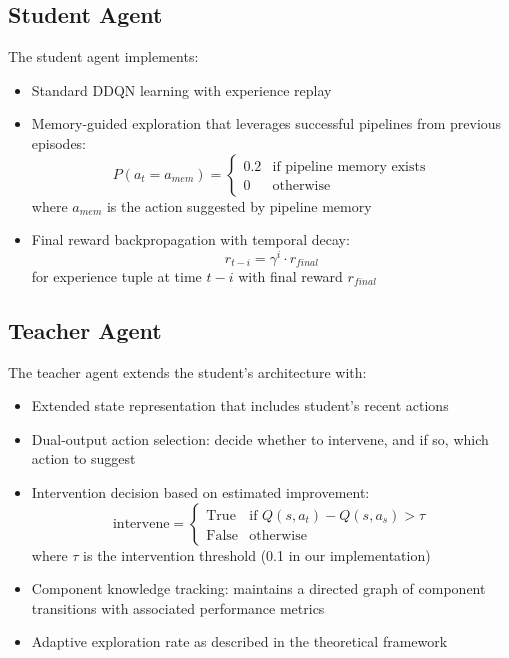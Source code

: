 \documentclass[twoside,11pt]{article}
\begin{document}
\subsection{Student Agent}

The student agent implements:

\begin{itemize}
    \item Standard DDQN learning with experience replay
    \item Memory-guided exploration that leverages successful pipelines from previous episodes:
    \begin{equation}
    P(a_t = a_{mem}) = 
    \begin{cases}
    0.2 & \text{if pipeline memory exists} \\
    0 & \text{otherwise}
    \end{cases}
    \end{equation}
    where $a_{mem}$ is the action suggested by pipeline memory
    
    \item Final reward backpropagation with temporal decay:
    \begin{equation}
    r_{t-i} = \gamma^i \cdot r_{final}
    \end{equation}
    for experience tuple at time $t-i$ with final reward $r_{final}$
\end{itemize}

\subsection{Teacher Agent}

The teacher agent extends the student's architecture with:

\begin{itemize}
    \item Extended state representation that includes student's recent actions
    \item Dual-output action selection: decide whether to intervene, and if so, which action to suggest
    \item Intervention decision based on estimated improvement:
    \begin{equation}
    \text{intervene} = 
    \begin{cases}
    \text{True} & \text{if } Q(s, a_t) - Q(s, a_s) > \tau \\
    \text{False} & \text{otherwise}
    \end{cases}
    \end{equation}
    where $\tau$ is the intervention threshold (0.1 in our implementation)
    
    \item Component knowledge tracking: maintains a directed graph of component transitions with associated performance metrics
    \item Adaptive exploration rate as described in the theoretical framework
\end{itemize}
\end{document}
